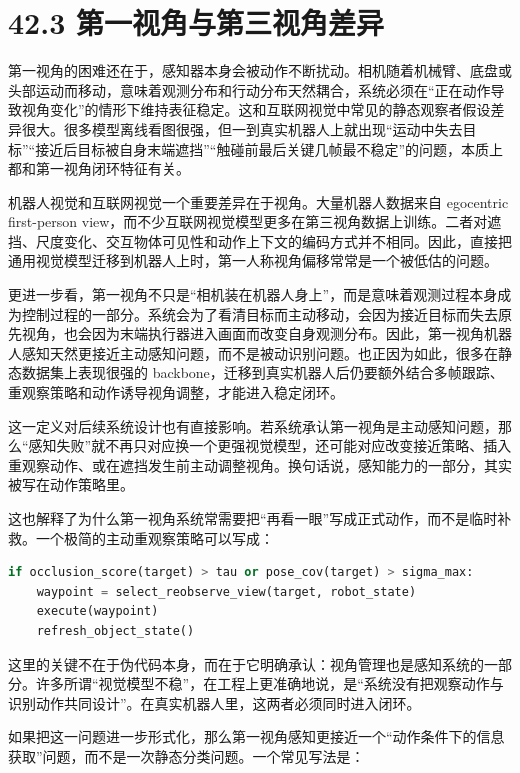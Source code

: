 \section*{42.3 第一视角与第三视角差异}


第一视角的困难还在于，感知器本身会被动作不断扰动。相机随着机械臂、底盘或头部运动而移动，意味着观测分布和行动分布天然耦合，系统必须在“正在动作导致视角变化”的情形下维持表征稳定。这和互联网视觉中常见的静态观察者假设差异很大。很多模型离线看图很强，但一到真实机器人上就出现“运动中失去目标”“接近后目标被自身末端遮挡”“触碰前最后关键几帧最不稳定”的问题，本质上都和第一视角闭环特征有关。

机器人视觉和互联网视觉一个重要差异在于视角。大量机器人数据来自 egocentric first-person view，而不少互联网视觉模型更多在第三视角数据上训练。二者对遮挡、尺度变化、交互物体可见性和动作上下文的编码方式并不相同。因此，直接把通用视觉模型迁移到机器人上时，第一人称视角偏移常常是一个被低估的问题。

更进一步看，第一视角不只是“相机装在机器人身上”，而是意味着观测过程本身成为控制过程的一部分。系统会为了看清目标而主动移动，会因为接近目标而失去原先视角，也会因为末端执行器进入画面而改变自身观测分布。因此，第一视角机器人感知天然更接近主动感知问题，而不是被动识别问题。也正因为如此，很多在静态数据集上表现很强的 backbone，迁移到真实机器人后仍要额外结合多帧跟踪、重观察策略和动作诱导视角调整，才能进入稳定闭环。

这一定义对后续系统设计也有直接影响。若系统承认第一视角是主动感知问题，那么“感知失败”就不再只对应换一个更强视觉模型，还可能对应改变接近策略、插入重观察动作、或在遮挡发生前主动调整视角。换句话说，感知能力的一部分，其实被写在动作策略里。

这也解释了为什么第一视角系统常需要把“再看一眼”写成正式动作，而不是临时补救。一个极简的主动重观察策略可以写成：

\begin{lstlisting}[language=python]
if occlusion_score(target) > tau or pose_cov(target) > sigma_max:
    waypoint = select_reobserve_view(target, robot_state)
    execute(waypoint)
    refresh_object_state()
\end{lstlisting}

这里的关键不在于伪代码本身，而在于它明确承认：视角管理也是感知系统的一部分。许多所谓“视觉模型不稳”，在工程上更准确地说，是“系统没有把观察动作与识别动作共同设计”。在真实机器人里，这两者必须同时进入闭环。

如果把这一问题进一步形式化，那么第一视角感知更接近一个“动作条件下的信息获取”问题，而不是一次静态分类问题。一个常见写法是：

